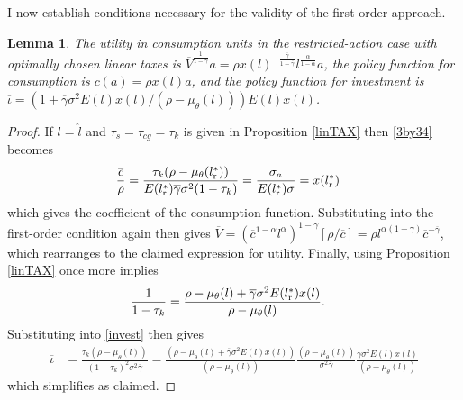 \documentclass[11pt]{article}
\theoremstyle{plain}
\newtheorem{lemma}[thm]{Lemma}
\begin{document}
I now establish conditions necessary for the validity of the first-order approach.

\begin{lemma}\label{valCOEFF}
The utility in consumption units in the restricted-action case with optimally chosen linear taxes is $\overline{V}^{\frac{1}{1-\overline{\gamma}}}a = \rho x(l)^{-\frac{\overline{\gamma}}{1-\overline{\gamma}}}l^{\frac{\alpha}{1-\alpha}}a$, the policy function for consumption is $c(a) = \rho x(l) a$, and the policy function for investment is $\overline{\iota} = {\left(1 + \overline{\gamma}\sigma^2E(l)x(l)/(\rho - \mu_{\theta}(l))\right)}E(l)x(l)$.
\end{lemma}
\begin{proof} %
If $l=\hat{l}$ and $\tau_s = \tau_{cg} = \tau_k$ is given in Proposition \ref{linTAX} then \eqref{3by34} becomes 
\begin{equation}
\begin{aligned}
\frac{\overline{c}}{\rho} & = \frac{\tau_k(\rho - \mu_{\theta}(l_{\textnormal{r}}^*))}{E(l_{\textnormal{r}}^*)\overline{\gamma}\sigma^2(1-\tau_k)} = \frac{\sigma_a}{E(l_{\textnormal{r}}^*)\sigma} = x(l_{\textnormal{r}}^*)
 \end{aligned}
\label{3by342}
\end{equation} %
which gives the coefficient of the consumption function. Substituting into the first-order condition again then gives $\overline{V} = (\overline{c}^{1-\alpha}l^{\alpha})^{1-\gamma}[\rho/\overline{c}] = \rho l^{\alpha(1-\gamma)}\overline{c}^{-\overline{\gamma}}$, which rearranges to the claimed expression for utility. Finally, using Proposition \ref{linTAX} once more implies
\begin{align*}
\frac{1}{1 - \tau_k} & = \frac{\rho - \mu_{\theta}(l) + \overline{\gamma}\sigma^2E(l_{\textnormal{r}}^*)x(l)}{\rho - \mu_{\theta}(l)}.
\end{align*}
Substituting into \eqref{invest} then gives
\begin{align*}
\overline{\iota} & = \frac{\tau_k(\rho - \mu_{\theta}(l))}{(1-\tau_k)^2\sigma^2\overline{\gamma}} = \frac{(\rho - \mu_{\theta}(l) + \overline{\gamma}\sigma^2E(l)x(l))}{(\rho - \mu_{\theta}(l))}\frac{(\rho - \mu_{\theta}(l))}{\sigma^2\overline{\gamma}}\frac{\overline{\gamma}\sigma^2E(l)x(l)}{(\rho - \mu_{\theta}(l))}
\end{align*}
which simplifies as claimed.
\end{proof}
\end{document}
